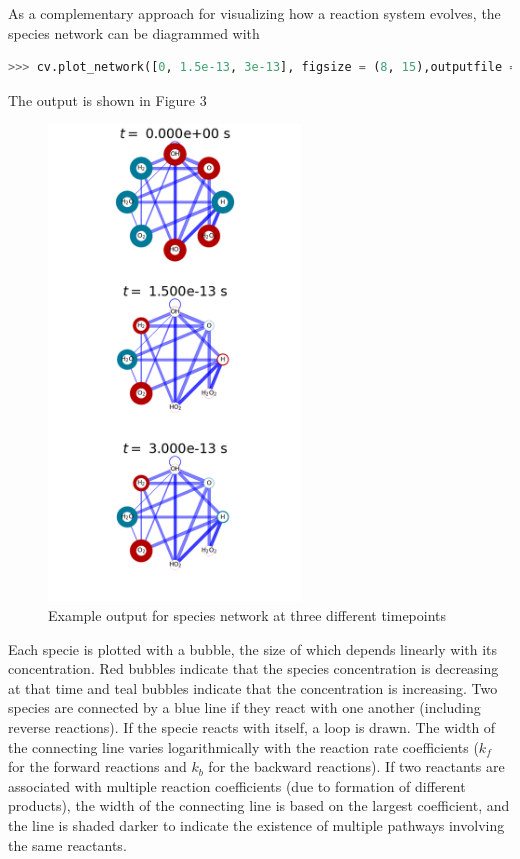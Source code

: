 \documentclass[12pt]{article}
\begin{document}
As a complementary approach for visualizing how a reaction system evolves, the species network can be diagrammed with 
\begin{lstlisting}[language = Python, basicstyle = \ttfamily,columns = fullflexible, showstringspaces = False]
>>> cv.plot_network([0, 1.5e-13, 3e-13], figsize = (8, 15),outputfile = `modeldocfig3.png')

\end{lstlisting}

The output is shown in Figure 3

\begin{figure}[h!]
  \caption{Example output for species network at three different timepoints}
  \centering
  \includegraphics[width=0.6\textwidth]{../examples/modeldocfig3.png}
\end{figure}

Each specie is plotted with a bubble, the size of which depends linearly with its concentration. Red bubbles indicate that the species concentration is decreasing at that time and teal bubbles indicate that the concentration is increasing. Two species are connected by a blue line if they react with one another (including reverse reactions). If the specie reacts with itself, a loop is drawn. The width of the connecting line varies logarithmically with the reaction rate coefficients ($k_f$ for the forward reactions and $k_b$ for the backward reactions). If two reactants are associated with multiple reaction coefficients (due to formation of different products), the width of the connecting line is based on the largest coefficient, and the line is shaded darker to indicate the existence of multiple pathways involving the same reactants. 
\end{document}
